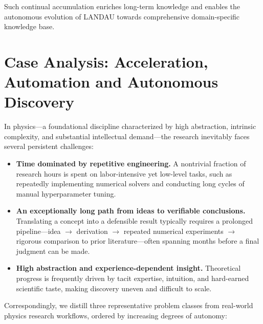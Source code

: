 \documentclass[11pt, a4paper, logo, copyright, nonumbering]{SAI}
\newcommand{\knowledge}{\textsc{LANDAU}\xspace}
\begin{document}
Such continual accumulation enriches long-term knowledge and enables the autonomous evolution of \knowledge towards comprehensive domain-specific knowledge base.


\section{Case Analysis: Acceleration, Automation and Autonomous Discovery}
\label{sec:case}

In physics---a foundational discipline characterized by high abstraction, intrinsic complexity, and substantial intellectual demand---the research inevitably faces several persistent challenges:

\vspace{-1.6ex}
\begin{itemize}
    \item \textbf{Time dominated by repetitive engineering.} A nontrivial fraction of research hours is spent on labor-intensive yet low-level tasks, such as repeatedly implementing numerical solvers and conducting long cycles of manual hyperparameter tuning.
    \item \textbf{An exceptionally long path from ideas to verifiable conclusions.} Translating a concept into a defensible result typically requires a prolonged pipeline---idea $\rightarrow$ derivation $\rightarrow$ repeated numerical experiments $\rightarrow$ rigorous comparison to prior literature---often spanning months before a final judgment can be made.
    \item \textbf{High abstraction and experience-dependent insight.} Theoretical progress is frequently driven by tacit expertise, intuition, and hard-earned scientific taste, making discovery uneven and difficult to scale.
\end{itemize}
\vspace{-1.6ex}

Correspondingly, we distill three representative problem classes from real-world physics research workflows, ordered by increasing degrees of autonomy:
\end{document}

